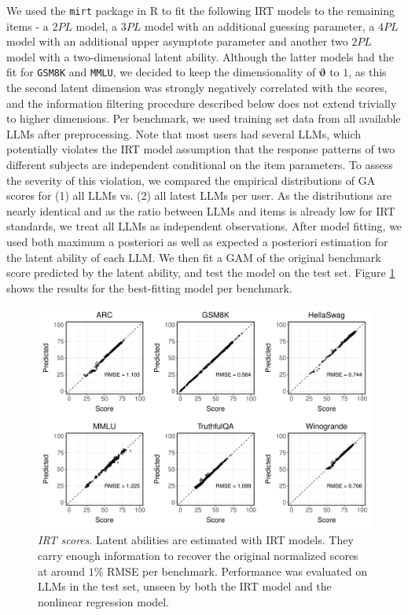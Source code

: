 \documentclass{article}
\begin{document}
We used the \texttt{mirt} package in R to fit the following IRT models to the remaining items - a $2PL$ model, a $3PL$ model with an additional guessing parameter, a $4PL$ model with an additional upper asymptote parameter and another two $2PL$ model with a two-dimensional latent ability. Although the latter models had the fit for \texttt{GSM8K} and \texttt{MMLU}, we decided to keep the dimensionality of $\boldsymbol \vartheta$ to $1$, as this the second latent dimension was strongly negatively correlated with the scores, and the information filtering procedure described below does not extend trivially to higher dimensions.
Per benchmark, we used training set data from all available LLMs after preprocessing. Note that most users had several LLMs, which potentially violates the IRT model assumption that the response patterns of two different subjects are independent conditional on the item parameters. To assess the severity of this violation, we compared the empirical distributions of GA scores for (1) all LLMs vs. (2) all latest LLMs per user. As the distributions are nearly identical and as the ratio between LLMs and items is already low for IRT standards, we treat all LLMs as independent observations.
After model fitting, we used both maximum a posteriori as well as expected a posteriori estimation for the latent ability of each LLM. We then fit a GAM of the original benchmark score predicted by the latent ability, and test the model on the test set. Figure \ref{fig:score.full} shows the results for the best-fitting model per benchmark.
\begin{figure}[]
   \centering
   \includegraphics[width=1.0\textwidth]{figures/score.full.pdf}
   \caption{\textit{IRT scores}. Latent abilities are estimated with IRT models. They carry enough information to recover the original normalized scores at around $1\%$ RMSE per benchmark. Performance was evaluated on LLMs in the test set, unseen by both the IRT model and the nonlinear regression model.}
   \label{fig:score.full}
\end{figure}
\end{document}
